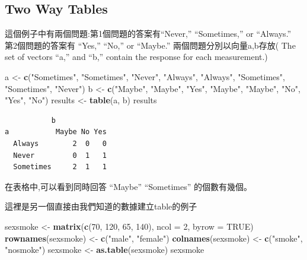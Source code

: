 \documentclass[]{book}
\newenvironment{Shaded}{\begin{snugshade}}{\end{snugshade}}
\newcommand{\DataTypeTok}[1]{\textcolor[rgb]{0.13,0.29,0.53}{#1}}
\newcommand{\DecValTok}[1]{\textcolor[rgb]{0.00,0.00,0.81}{#1}}
\newcommand{\KeywordTok}[1]{\textcolor[rgb]{0.13,0.29,0.53}{\textbf{#1}}}
\newcommand{\NormalTok}[1]{#1}
\newcommand{\OtherTok}[1]{\textcolor[rgb]{0.56,0.35,0.01}{#1}}
\newcommand{\StringTok}[1]{\textcolor[rgb]{0.31,0.60,0.02}{#1}}
\theoremstyle{definition}
\theoremstyle{definition}
\theoremstyle{definition}
\theoremstyle{remark}
\begin{document}
\hypertarget{two-way-tables}{%
\subsection{Two Way Tables}\label{two-way-tables}}

這個例子中有兩個問題:第1個問題的答案有``Never,'' ``Sometimes,'' or
``Always.''\\
第2個問題的答案有 ``Yes,'' ``No,'' or ``Maybe.''
兩個問題分別以向量a,b存放( The set of vectors ``a,'' and ``b,'' contain
the response for each measurement.)

\begin{Shaded}
\begin{Highlighting}[]
\NormalTok{a <-}\StringTok{ }\KeywordTok{c}\NormalTok{(}\StringTok{"Sometimes"}\NormalTok{, }\StringTok{"Sometimes"}\NormalTok{, }\StringTok{"Never"}\NormalTok{, }\StringTok{"Always"}\NormalTok{, }\StringTok{"Always"}\NormalTok{, }\StringTok{"Sometimes"}\NormalTok{, }\StringTok{"Sometimes"}\NormalTok{, }\StringTok{"Never"}\NormalTok{)}
\NormalTok{b <-}\StringTok{ }\KeywordTok{c}\NormalTok{(}\StringTok{"Maybe"}\NormalTok{, }\StringTok{"Maybe"}\NormalTok{, }\StringTok{"Yes"}\NormalTok{, }\StringTok{"Maybe"}\NormalTok{, }\StringTok{"Maybe"}\NormalTok{, }\StringTok{"No"}\NormalTok{, }\StringTok{"Yes"}\NormalTok{, }\StringTok{"No"}\NormalTok{)}
\NormalTok{results <-}\StringTok{ }\KeywordTok{table}\NormalTok{(a, b)}
\NormalTok{results}
\end{Highlighting}
\end{Shaded}

\begin{verbatim}
           b
a           Maybe No Yes
  Always        2  0   0
  Never         0  1   1
  Sometimes     2  1   1
\end{verbatim}

在表格中,可以看到同時回答 ``Maybe'' ``Sometimes'' 的個數有幾個。

這裡是另一個直接由我們知道的數據建立table的例子

\begin{Shaded}
\begin{Highlighting}[]
\NormalTok{sexsmoke <-}\StringTok{ }\KeywordTok{matrix}\NormalTok{(}\KeywordTok{c}\NormalTok{(}\DecValTok{70}\NormalTok{, }\DecValTok{120}\NormalTok{, }\DecValTok{65}\NormalTok{, }\DecValTok{140}\NormalTok{), }\DataTypeTok{ncol =} \DecValTok{2}\NormalTok{, }\DataTypeTok{byrow =} \OtherTok{TRUE}\NormalTok{)}
\KeywordTok{rownames}\NormalTok{(sexsmoke) <-}\StringTok{ }\KeywordTok{c}\NormalTok{(}\StringTok{"male"}\NormalTok{, }\StringTok{"female"}\NormalTok{)}
\KeywordTok{colnames}\NormalTok{(sexsmoke) <-}\StringTok{ }\KeywordTok{c}\NormalTok{(}\StringTok{"smoke"}\NormalTok{, }\StringTok{"nosmoke"}\NormalTok{)}
\NormalTok{sexsmoke <-}\StringTok{ }\KeywordTok{as.table}\NormalTok{(sexsmoke)}
\NormalTok{sexsmoke}
\end{Highlighting}
\end{Shaded}
\end{document}
